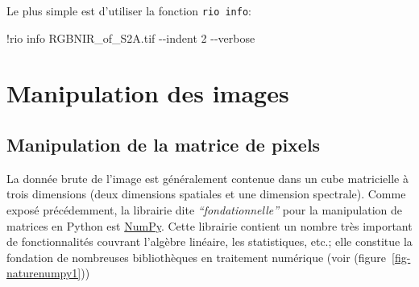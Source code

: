 \documentclass[
  11pt,
  letterpaper,
  open=any,
  twoside=false,
  french]{scrbook}
\newenvironment{Shaded}{\begin{snugshade}}{\end{snugshade}}
\newcommand{\DecValTok}[1]{\textcolor[rgb]{0.68,0.00,0.00}{#1}}
\newcommand{\NormalTok}[1]{\textcolor[rgb]{0.00,0.23,0.31}{#1}}
\newcommand{\OperatorTok}[1]{\textcolor[rgb]{0.37,0.37,0.37}{#1}}
\begin{document}
Le plus simple est d'utiliser la fonction \texttt{rio\ info}:

\begin{Shaded}
\begin{Highlighting}[]
\OperatorTok{!}\NormalTok{rio info RGBNIR\_of\_S2A.tif }\OperatorTok{{-}{-}}\NormalTok{indent }\DecValTok{2} \OperatorTok{{-}{-}}\NormalTok{verbose}
\end{Highlighting}
\end{Shaded}

\section{Manipulation des images}\label{manipulation-des-images}

\subsection{Manipulation de la matrice de
pixels}\label{manipulation-de-la-matrice-de-pixels}

La donnée brute de l'image est généralement contenue dans un cube
matricielle à trois dimensions (deux dimensions spatiales et une
dimension spectrale). Comme exposé précédemment, la librairie dite
\emph{``fondationnelle''} pour la manipulation de matrices en Python est
\href{https://numpy.org/}{NumPy}. Cette librairie contient un nombre
très important de fonctionnalités couvrant l'algèbre linéaire, les
statistiques, etc.; elle constitue la fondation de nombreuses
bibliothèques en traitement numérique (voir
(figure~\ref{fig-naturenumpy1}))
\end{document}
